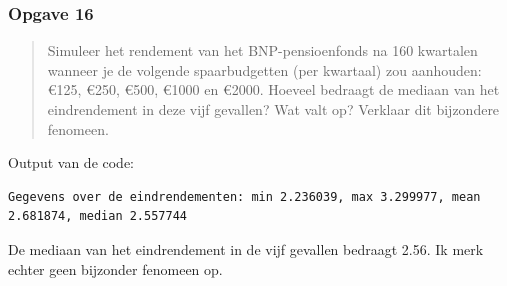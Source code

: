 \documentclass[11pt, a4paper, titlepage, openright]{article}
\begin{document}
	\newpage
	\subsubsection{Opgave 16}
		\begin{quote}
			Simuleer het rendement van het BNP-pensioenfonds na 160 kwartalen wanneer je de volgende spaarbudgetten (per kwartaal)
			zou aanhouden: \euro125, \euro250, \euro500, \euro1000 en \euro2000. Hoeveel bedraagt de mediaan van het eindrendement
			in deze vijf gevallen? Wat valt op? Verklaar dit bijzondere fenomeen.
		\end{quote}

		\noindent Output van de code:
\begin{lstlisting}
Gegevens over de eindrendementen: min 2.236039, max 3.299977, mean 2.681874, median 2.557744\end{lstlisting}
		De mediaan van het eindrendement in de vijf gevallen bedraagt 2.56. Ik merk echter geen bijzonder fenomeen op.
\end{document}
